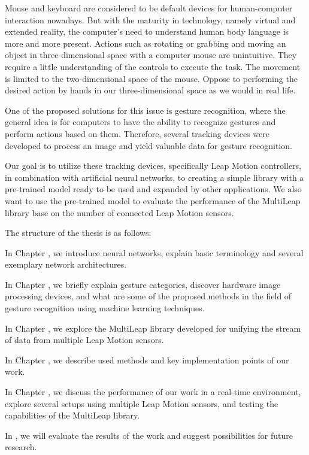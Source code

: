 Mouse and keyboard are considered to be default devices for human-computer interaction nowadays. But with the maturity in technology, namely virtual and extended reality, the computer's need to understand human body language is more and more present. Actions such as rotating or grabbing and moving an object in three-dimensional space with a computer mouse are unintuitive. They require a little understanding of the controls to execute the task. The movement is limited to the two-dimensional space of the mouse. Oppose to performing the desired action by hands in our three-dimensional space as we would in real life.

One of the proposed solutions for this issue is gesture recognition, where the general idea is for computers to have the ability to recognize gestures and perform actions based on them. Therefore, several tracking devices were developed to process an image and yield valuable data for gesture recognition.

Our goal is to utilize these tracking devices, specifically Leap Motion controllers, in combination with artificial neural networks, to creating a simple library with a pre-trained model ready to be used and expanded by other applications. We also want to use the pre-trained model to evaluate the performance of the MultiLeap library base on the number of connected Leap Motion sensors.

The structure of the thesis is as follows:
\begin{description}

    \item In Chapter , we introduce neural networks, explain basic terminology and several exemplary network architectures.
    
    \item In Chapter , we briefly explain gesture categories, discover hardware image processing devices, and what are some of the proposed methods in the field of gesture recognition using machine learning techniques.
    
    \item In Chapter , we explore the MultiLeap library developed for unifying the stream of data from multiple Leap Motion sensors.
    
    \item In Chapter , we describe used methods and key implementation points of our work.
    
    \item In Chapter , we discuss the performance of our work in a real-time environment, explore several setups using multiple Leap Motion sensors, and testing the capabilities of the MultiLeap library.

    \item In , we will evaluate the results of the work and suggest possibilities for future research.
\end{description}